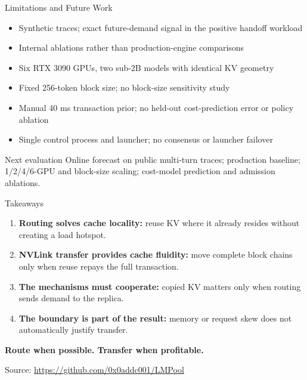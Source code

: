 \documentclass[aspectratio=169,10pt]{beamer}
\newcommand{\metric}[1]{\textcolor{LMBlue}{\bfseries #1}}
\newcommand{\good}[1]{\textcolor{LMGreen}{\bfseries #1}}
\begin{document}
\begin{frame}{Limitations and Future Work}
  \small
  \begin{itemize}
    \item Synthetic traces; exact future-demand signal in the positive handoff workload
    \item Internal ablations rather than production-engine comparisons
    \item Six RTX 3090 GPUs, two sub-2B models with identical KV geometry
    \item Fixed 256-token block size; no block-size sensitivity study
    \item Manual 40 ms transaction prior; no held-out cost-prediction error or policy ablation
    \item Single control process and launcher; no consensus or launcher failover
  \end{itemize}
  \vspace{0.5em}
  \begin{block}{Next evaluation}
    Online forecast on public multi-turn traces; production baseline; 1/2/4/6-GPU and block-size scaling; cost-model prediction and admission ablations.
  \end{block}
\end{frame}

\begin{frame}{Takeaways}
  \begin{enumerate}
    \item \metric{Routing solves cache locality:} reuse KV where it already resides without creating a load hotspot.
    \item \metric{NVLink transfer provides cache fluidity:} move complete block chains only when reuse repays the full transaction.
    \item \metric{The mechanisms must cooperate:} copied KV matters only when routing sends demand to the replica.
    \item \metric{The boundary is part of the result:} memory or request skew does not automatically justify transfer.
  \end{enumerate}
  \vspace{1em}
  \begin{center}
    \Large\good{Route when possible. Transfer when profitable.}
  \end{center}
  \vfill
  \begin{center}
    \small Source: \url{https://github.com/0x0addc001/LMPool}
  \end{center}
\end{frame}
\end{document}
